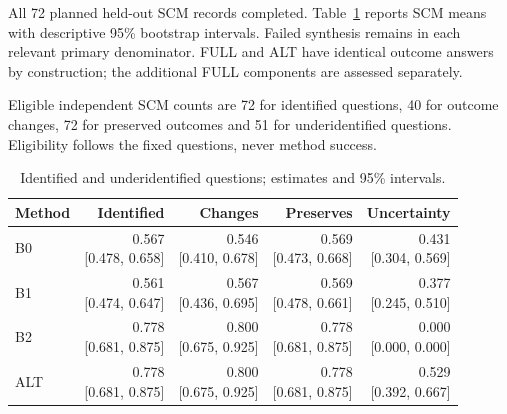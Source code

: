 All 72 planned held-out SCM records completed. Table~\ref{tab:primary} reports SCM means with descriptive 95\% bootstrap intervals. Failed synthesis remains in each relevant primary denominator. FULL and ALT have identical outcome answers by construction; the additional FULL components are assessed separately.

Eligible independent SCM counts are 72 for identified questions, 40 for outcome changes, 72 for preserved outcomes and 51 for underidentified questions. Eligibility follows the fixed questions, never method success.

\begin{table}[t]\centering\small\setlength{\tabcolsep}{3pt}

\caption{Identified and underidentified questions; estimates and 95\% intervals.}\label{tab:primary}

\begin{tabular}{lrrrr}\toprule Method & Identified & Changes & Preserves & Uncertainty\\\midrule

B0 & \shortstack{0.567\\{[0.478, 0.658]}} & \shortstack{0.546\\{[0.410, 0.678]}} & \shortstack{0.569\\{[0.473, 0.668]}} & \shortstack{0.431\\{[0.304, 0.569]}}\\

B1 & \shortstack{0.561\\{[0.474, 0.647]}} & \shortstack{0.567\\{[0.436, 0.695]}} & \shortstack{0.569\\{[0.478, 0.661]}} & \shortstack{0.377\\{[0.245, 0.510]}}\\

B2 & \shortstack{0.778\\{[0.681, 0.875]}} & \shortstack{0.800\\{[0.675, 0.925]}} & \shortstack{0.778\\{[0.681, 0.875]}} & \shortstack{0.000\\{[0.000, 0.000]}}\\

ALT & \shortstack{0.778\\{[0.681, 0.875]}} & \shortstack{0.800\\{[0.675, 0.925]}} & \shortstack{0.778\\{[0.681, 0.875]}} & \shortstack{0.529\\{[0.392, 0.667]}}\\


\end{tabular}
\end{table}
